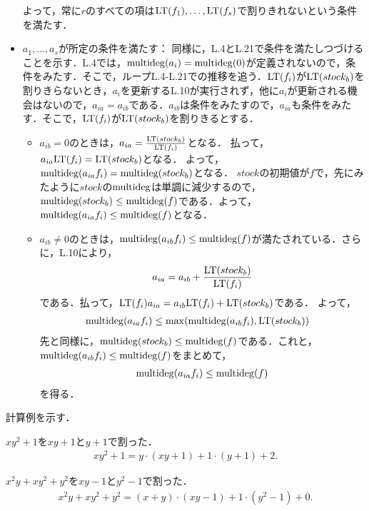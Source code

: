 \begin{myproof}
\begin{itemize}
よって，常に$r$のすべての項は${\rm LT}(f_1),\dots,{\rm LT}(f_s)$で割りきれないという条件を満たす．
  \item $a_1,\dots,a_s$が所定の条件を満たす：
同様に，L.4とL.21で条件を満たしつづけることを示す．L.4では，$\mathrm{multideg}(a_i)=\mathrm{multideg}(0)$が定義されないので，条件をみたす．そこで，ループL.4-L.21での推移を追う．${\rm LT}(f_i)$が${\rm LT}(stock_b)$を割りきらないとき，$a_i$を更新するL.10が実行されず，他に$a_i$が更新される機会はないので，$a_{ia}=a_{ib}$である．$a_{ib}$は条件をみたすので，$a_{ia}$も条件をみたす．そこで，${\rm LT}(f_i)$が${\rm LT}(stock_b)$を割りきるとする．
\begin{itemize}
 \item
$a_{ib}=0$のときは，$a_{ia}=\frac{{\rm LT}(stock_b)}{{\rm LT}(f_i)}$となる．
払って，$a_{ia}{\rm LT}(f_i) = {\rm LT}(stock_b)$となる．
よって，$\mathrm{multideg}(a_{ia} f_i)=\mathrm{multideg}(stock_b)$となる．
$stock$の初期値が$f$で，先にみたように$stock$の$\mathrm{multideg}$は単調に減少するので，
$\mathrm{multideg}(stock_b) \le \mathrm{multideg}(f)$である．よって，$\mathrm{multideg}(a_{ia}f_i) \le \mathrm{multideg}(f)$となる．
 \item $a_{ib}\neq 0$のときは，$\mathrm{multideg}(a_{ib}f_i)\le \mathrm{multideg}(f)$が満たされている．さらに，L.10により，
\begin{align}
 a_{ia} = a_{ib} + \frac{{\rm LT}(stock_b)}{{\rm LT}(f_i)}
\end{align}
である．払って，${\rm LT}(f_i)a_{ia} = a_{ib}{\rm LT}(f_i) + {\rm LT}(stock_b)$である．
よって，
\begin{align}
 \mathrm{multideg}(a_{ia} f_i)
&\le \max(\mathrm{multideg}(a_{ib}f_i),{\rm LT}(stock_b))
\end{align}
先と同様に，$\mathrm{multideg}(stock_b)\le \mathrm{multideg}(f)$である．これと，$\mathrm{multideg}(a_{ib}f_i)\le \mathrm{multideg}(f)$をまとめて，
\begin{align}
 \mathrm{multideg}(a_{ia}f_i) \le \mathrm{multideg}(f)
\end{align}
を得る．
\end{itemize}
 \end{itemize}
\end{myproof}

計算例を示す．



$xy^2+1$を$xy+1$と$y+1$で割った．
\begin{align}
 xy^2 +1 = y\cdot (xy+1) + 1\cdot (y+1) + 2.
\end{align}


$x^2y+xy^2 + y^2$を$xy-1$と$y^2-1$で割った．
\begin{align}
 x^2y + xy^2 + y^2 = (x+y)\cdot (xy-1) + 1\cdot (y^2-1) + 0.
\end{align}

